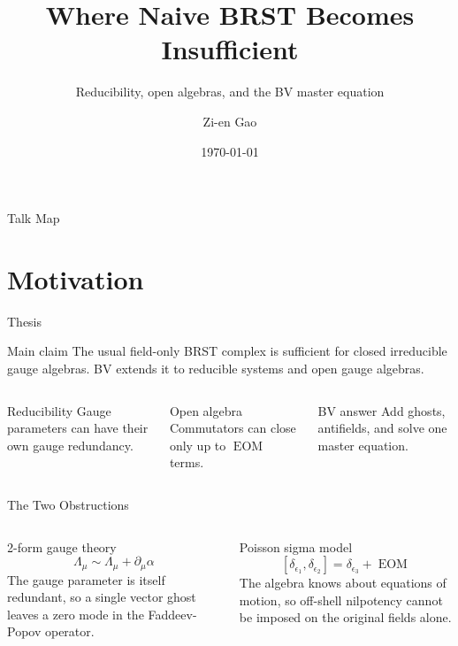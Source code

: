 \documentclass[aspectratio=169,professionalfonts]{beamer}
\title[Where Naive BRST Fails]{Where Naive BRST Becomes Insufficient}
\subtitle{Reducibility, open algebras, and the BV master equation}
\author[Zi-en Gao]{Zi-en Gao}
\date{\today}
\newcommand{\EOM}{\ensuremath{\operatorname{EOM}}}
\begin{document}
\begin{frame}[plain]
  \titlepage
\end{frame}

\begin{frame}{Talk Map}
  \tableofcontents
\end{frame}

\section{Motivation}

\begin{frame}{Thesis}
  \begin{alertblock}{Main claim}
    The usual field-only BRST complex is sufficient for closed irreducible
    gauge algebras. BV extends it to reducible systems and open gauge
    algebras.
  \end{alertblock}

  \vspace{0.25cm}
  \begin{columns}[T,onlytextwidth]
    \begin{block}{Reducibility}
      Gauge parameters can have their own gauge redundancy.
    \end{block}

    \begin{block}{Open algebra}
      Commutators can close only up to \EOM{} terms.
    \end{block}

    \begin{block}{BV answer}
      Add ghosts, antifields, and solve one master equation.
    \end{block}
  \end{columns}
\end{frame}

\begin{frame}{The Two Obstructions}
  \begin{columns}[T,onlytextwidth]
    \begin{exampleblock}{2-form gauge theory}
      \[
        \Lambda_\mu \sim \Lambda_\mu+\partial_\mu\alpha
      \]
      The gauge parameter is itself redundant, so a single vector ghost leaves
      a zero mode in the Faddeev-Popov operator.
    \end{exampleblock}

    \begin{exampleblock}{Poisson sigma model}
      \[
        [\delta_{\epsilon_1},\delta_{\epsilon_2}]
        =\delta_{\epsilon_3}+\EOM
      \]
      The algebra knows about equations of motion, so off-shell nilpotency
      cannot be imposed on the original fields alone.
    \end{exampleblock}
  \end{columns}
\end{frame}
\end{document}
